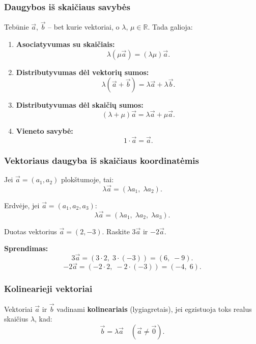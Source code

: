 \subsubsection*{Daugybos iš skaičiaus savybės}

\begin{theorem}
Tebūnie $\vec{a}$, $\vec{b}$ – bet kurie vektoriai, o $\lambda$, $\mu \in \mathbb{R}$.
Tada galioja:
\begin{enumerate}[label=\arabic*°]
  \item \textbf{Asociatyvumas su skaičiais:}
        \[
          \lambda(\mu\vec{a}) = (\lambda\mu)\vec{a}.
        \]
  \item \textbf{Distributyvumas dėl vektorių sumos:}
        \[
          \lambda(\vec{a} + \vec{b}) = \lambda\vec{a} + \lambda\vec{b}.
        \]
  \item \textbf{Distributyvumas dėl skaičių sumos:}
        \[
          (\lambda + \mu)\vec{a} = \lambda\vec{a} + \mu\vec{a}.
        \]
  \item \textbf{Vieneto savybė:}
        \[
          1 \cdot \vec{a} = \vec{a}.
        \]
\end{enumerate}
\end{theorem}

\subsubsection*{Vektoriaus daugyba iš skaičiaus koordinatėmis}

Jei $\vec{a} = (a_1, a_2)$ plokštumoje, tai:
\[
  \lambda\vec{a} = (\lambda a_1,\; \lambda a_2).
\]

Erdvėje, jei $\vec{a} = (a_1, a_2, a_3)$:
\[
  \lambda\vec{a} = (\lambda a_1,\; \lambda a_2,\; \lambda a_3).
\]

\begin{example}
Duotas vektorius $\vec{a} = (2, -3)$. Raskite $3\vec{a}$ ir $-2\vec{a}$.

\textbf{Sprendimas:}
\[
  3\vec{a} = (3 \cdot 2,\; 3 \cdot (-3)) = (6,\; -9).
\]
\[
  -2\vec{a} = (-2 \cdot 2,\; -2 \cdot (-3)) = (-4,\; 6).
\]
\end{example}

\subsubsection*{Kolinearieji vektoriai}

\begin{definition}
Vektoriai $\vec{a}$ ir $\vec{b}$ vadinami \textbf{kolineariais} (lygiagretais), jei egzistuoja
toks realus skaičius $\lambda$, kad:
\[
  \vec{b} = \lambda\vec{a} \quad (\vec{a} \ne \vec{0}).
\]
\end{definition}

